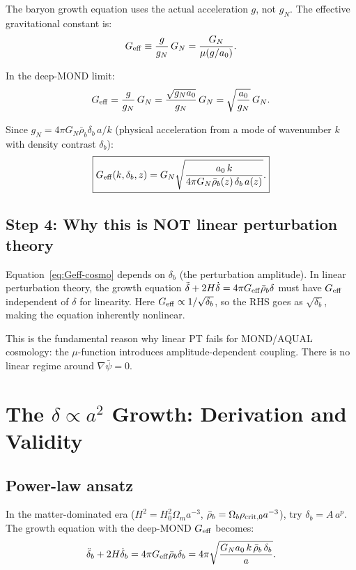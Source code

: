 \documentclass[11pt]{article}
\newcommand{\Geff}{G_{\rm eff}}
\newcommand{\aM}{a_0}
\begin{document}
The baryon growth equation uses the actual acceleration $g$, not $g_N$.
The effective gravitational constant is:
\begin{equation}
\Geff \equiv \frac{g}{g_N}\,G_N = \frac{G_N}{\mu(g/\aM)}.
\label{eq:Geff-def}
\end{equation}

In the deep-MOND limit:
\begin{equation}
\Geff = \frac{g}{g_N}\,G_N = \frac{\sqrt{g_N\aM}}{g_N}\,G_N
= \sqrt{\frac{\aM}{g_N}}\,G_N.
\label{eq:Geff-deep}
\end{equation}

Since $g_N = 4\pi G_N\bar\rho_b\delta_b\,a/k$ (physical acceleration
from a mode of wavenumber $k$ with density contrast $\delta_b$):
\begin{equation}
\boxed{
\Geff(k, \delta_b, z) = G_N\sqrt{\frac{\aM\,k}{4\pi G_N\bar\rho_b(z)\,\delta_b\,a(z)}}.
}
\label{eq:Geff-cosmo}
\end{equation}

\subsection{Step 4: Why this is NOT linear perturbation theory}

Equation~\eqref{eq:Geff-cosmo} depends on $\delta_b$ (the perturbation
amplitude). In linear perturbation theory, the growth equation
$\ddot\delta + 2H\dot\delta = 4\pi\Geff\bar\rho_b\delta$ must have
$\Geff$ independent of $\delta$ for linearity. Here $\Geff \propto
1/\sqrt{\delta_b}$, so the RHS goes as $\sqrt{\delta_b}$, making the
equation inherently nonlinear.

This is the fundamental reason why linear PT fails for MOND/AQUAL
cosmology: the $\mu$-function introduces amplitude-dependent coupling.
There is no linear regime around $\nabla\bar\psi = 0$.

\section{The $\delta \propto a^2$ Growth: Derivation and Validity}

\subsection{Power-law ansatz}

In the matter-dominated era ($H^2 = H_0^2\Omega_m a^{-3}$,
$\bar\rho_b = \Omega_b\rho_{\rm crit,0}a^{-3}$), try $\delta_b = A\,a^p$.
The growth equation with the deep-MOND $\Geff$ becomes:
\begin{equation}
\ddot\delta_b + 2H\dot\delta_b = 4\pi\Geff\bar\rho_b\delta_b
= 4\pi\sqrt{\frac{G_N\aM\,k\,\bar\rho_b\,\delta_b}{a}}.
\label{eq:growth-deep}
\end{equation}
\end{document}
